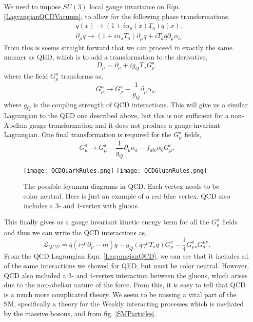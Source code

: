 We need to impose $SU(3)$ local gauge invariance on Eqn. \ref{LagrangianQCDVacuum}, to allow for the following phase transformations,
\begin{equation}
\begin{split}
& q(x)\rightarrow(1+i\alpha_a(x)T_a)q(x), \\
& \partial_\mu q\rightarrow(1+i\alpha_aT_a)\partial_\mu q+iT_aq\partial_\mu\alpha_a.
\end{split}
\end{equation}
From this is seems straight forward that we can proceed in exactly the same manner as QED, which is to add a transformation to the derivative,
\begin{equation}
D_\mu=\partial_\mu+ig_Q T_aG_\mu^a.
\end{equation}
where the field $G_\mu^a$ transforms as, 
\begin{equation}
G_\mu^a\rightarrow G_\mu^a-\frac{1}{g_Q}\partial_\mu\alpha_a,
\end{equation}
where $g_Q$ is the coupling strength of QCD interactions. This will give us a similar Lagrangian to the QED one described above, but this is not sufficient for a non-Abelian gauge transformation and it does not produce a gauge-invariant Lagrangian. One final transformation is required for the $G_\mu^a$ fields, 
\begin{equation}\label{QCDGaugeTransform}
G_\mu^a\rightarrow G_\mu^a-\frac{1}{g_Q}\partial_\mu\alpha_a-f_{abc}\alpha_b G_\mu^c.
\end{equation}

\begin{figure}[!htb]
	  \texttt{[image: QCDQuarkRules.png]}
	\endminipage\hfill
	  \texttt{[image: QCDGluonRules.png]}
	\endminipage\hfill
	\caption[QCD Feynman Diagrams]{The possible feynman diagrams in QCD. Each vertex needs to be color neutral. Here is just an example of a red-blue vertex. QCD also includes a 3- and 4-vertex with gluons.}
 	\label{QCDRules} 
\end{figure}

This finally gives us a gauge invariant kinetic energy term for all the $G_\mu^a$ fields and thus we can write the QCD interactions as,
\begin{equation}\label{LagrangianQCD}
\mathcal{L}_{QCD}=\overline{q}(i\gamma^\mu\partial_\mu-m)q-g_Q(\overline{q}\gamma^\mu T_a q)G^a_\mu-\frac{1}{4}G^a_{\mu\nu}G_a^{\mu\nu}.
\end{equation}
From the QCD Lagrangian Eqn. \ref{LagrangianQCD}, we can see that it includes all of the same interactions we showed for QED, but must be color neutral. However, QCD also included a 3- and 4-vertex interaction between the gluons, which arises due to the non-abelian nature of the force. From this, it is easy to tell that QCD is a much more complicated theory. We seem to be missing a vital part of the SM, specifically a theory for the Weakly interacting processes which is mediated by the massive bosons, \W{} and \Z{} from fig. \ref{SMParticles}. 

